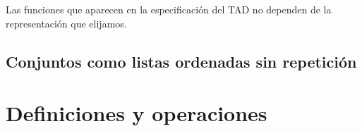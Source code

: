 \begin{nota}
  Las funciones que aparecen en la especificación del TAD no dependen 
  de la representación que elijamos.
\end{nota}

\subsection{Conjuntos como listas ordenadas sin repetición}


\section{Definiciones y operaciones}

